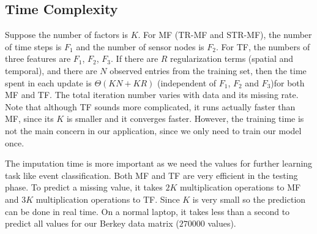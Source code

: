 \subsection{Time Complexity}
Suppose the number of factors is $K$.
For MF (TR-MF and STR-MF), the number of time steps is $F_1$ and the number of sensor nodes is $F_2$. 
For TF, the numbers of three features are $F_1$, $F_2$, $F_3$.  
If there are $R$ regularization terms (spatial and temporal), and there are $N$ observed entries from the training set, then the time spent in each update is $\Theta(KN + KR)$ (independent of $F_1$, $F_2$ and $F_3$)for both MF and TF. 
The total iteration number varies with data and its missing rate. Note that although TF sounds more complicated, it runs actually faster than MF, since its $K$ is smaller and it converges faster.
However, the training time is not the main concern in our application, since we only need to train our model once.

The imputation time is more important as we need the values for further learning task like event classification.
Both MF and TF are very efficient in the testing phase.
To predict a missing value, it takes $2K$ multiplication operations to MF and $3K$ multiplication operations to TF.
Since $K$ is very small so the prediction can be done in real time.
On a normal laptop, it takes less than a second to predict all values for our Berkey data matrix ($270000$ values).

